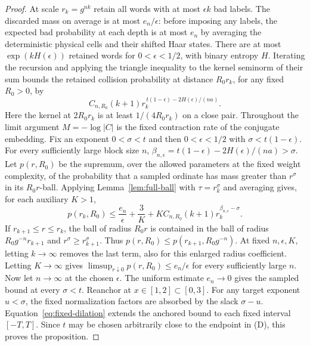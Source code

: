 \documentclass[11pt,a4paper]{article}
\begin{document}
\begin{proof}
At scale $r_k=g^{nk}$ retain all words with at most $\epsilon k$ bad labels. The discarded mass on average is at most $e_n/\epsilon$: before imposing any labels, the expected bad probability at each depth is at most $e_n$ by averaging the deterministic physical cells and their shifted Haar states. There are at most $\exp(kH(\epsilon))$ retained words for $0<\epsilon<1/2$, with binary entropy $H$. Iterating the recursion and applying the triangle inequality to the kernel seminorm of their sum bounds the retained collision probability at distance $R_0r_k$, for any fixed $R_0>0$, by
\[
 C_{n,R_0}(k+1)r_k^{\,t(1-\epsilon)-2H(\epsilon)/(na)} .
\]
Here the kernel at $2R_0r_k$ is at least $1/(4R_0r_k)$ on a close pair.
Throughout the limit argument $M=-\log|C|$ is the fixed contraction rate
of the conjugate embedding.
Fix an exponent $0<\sigma<t$ and then $0<\epsilon<1/2$ with
$\sigma<t(1-\epsilon)$. For every sufficiently large block size $n$,
$\beta_{n,\epsilon}=t(1-\epsilon)-2H(\epsilon)/(na)>\sigma$.
Let $p(r,R_0)$ be the supremum, over the allowed parameters at the fixed
weight complexity, of the probability that a sampled ordinate has
mass greater than $r^{\sigma}$ in its $R_0r$-ball. Applying
Lemma~\ref{lem:full-ball} with $\tau=r_k^{\sigma}$ and averaging gives, for
each auxiliary $K>1$,
\[
 p(r_k,R_0)\le \frac{e_n}{\epsilon}+\frac{3}{K}
           +K C_{n,R_0}(k+1) r_k^{\beta_{n,\epsilon}-\sigma}.
\]
If $r_{k+1}\le r\le r_k$, the ball of radius $R_0r$ is contained in
the ball of radius $R_0g^{-n}r_{k+1}$ and $r^{\sigma}\ge r_{k+1}^{\sigma}$.
Thus $p(r,R_0)\le p(r_{k+1},R_0g^{-n})$. At fixed $n,\epsilon,K$,
letting $k\to\infty$ removes the last term, also for this enlarged
radius coefficient. Letting $K\to\infty$ gives
$\limsup_{r\downarrow0}p(r,R_0)\le e_n/\epsilon$ for every sufficiently
large $n$. Now let $n\to\infty$ at the chosen $\epsilon$. The uniform
estimate $e_n\to0$ gives the sampled bound at every $\sigma<t$.
Reanchor at $x\in[1,2]\subset[0,3]$. For any target exponent $u<\sigma$,
the fixed normalization factors are absorbed by the slack $\sigma-u$.
Equation~\eqref{eq:fixed-dilation} extends the anchored bound to each
fixed interval $[-T,T]$. Since $t$ may be chosen arbitrarily close to
the endpoint in (D), this proves the proposition.

\end{proof}
\end{document}
